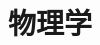 \documentclass[11pt,fleqn]{book} %
\begin{document}
\part{物理学}

% 
% 
% 
% 
% 
% 
% 
% 
\end{document}
